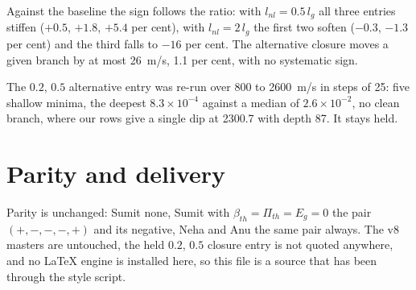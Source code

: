 \documentclass[11pt,a4paper]{article}
\begin{document}
Against the baseline the sign follows the ratio: with $l_{nl}=0.5\,l_g$ all three entries stiffen
($+0.5$, $+1.8$, $+5.4$ per cent), with $l_{nl}=2\,l_g$ the first two soften ($-0.3$, $-1.3$ per
cent) and the third falls to $-16$ per cent. The alternative closure moves a given branch by at
most 26~m/s, 1.1 per cent, with no systematic sign.

The $0.2$, $0.5$ alternative entry was re-run over 800 to 2600~m/s in steps of 25: five shallow
minima, the deepest $8.3\times10^{-4}$ against a median of $2.6\times10^{-2}$, no clean branch, where
our rows give a single dip at 2300.7 with depth 87. It stays held.

\section*{Parity and delivery}

Parity is unchanged: Sumit none, Sumit with $\beta_{th}=\Pi_{th}=E_g=0$ the pair
$(+,-,-,-,+)$ and its negative, Neha and Anu the same pair always. The v8 masters are untouched,
the held $0.2$, $0.5$ closure entry is not quoted anywhere, and no \LaTeX{} engine is installed
here, so this file is a source that has been through the style script.
\end{document}
